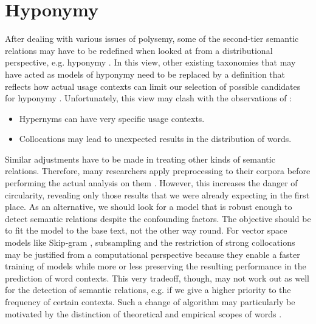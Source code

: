 
\chapter{Hyponymy}
After dealing with various issues of polysemy, some of the second-tier semantic relations may have to be redefined when looked at from a distributional perspective, e.g. hyponymy \parencite[443]{herbelotMeasuringSemanticContent2013}. In this view, other existing taxonomies that may have acted as models of hyponymy need to be replaced by a definition that reflects how actual usage contexts can limit our selection of possible candidates for hyponymy \parencite[443]{rollerInclusiveSelectiveSupervised2014}. Unfortunately, this view may clash with the observations of \textcite{herbelotMeasuringSemanticContent2013}:
\begin{itemize}
      \item Hypernyms can have very specific usage contexts.
      \item Collocations may lead to unexpected results in the distribution of words.
\end{itemize}
Similar adjustments have to be made in treating other kinds of semantic relations. Therefore, many researchers apply preprocessing to their corpora before performing the actual analysis on them \parencite[56f.]{gyllenstenRgramsUnsupervisedLearning2019}. However, this increases the danger of circularity, revealing only those results that we were already expecting in the first place. As an alternative, we should look for a model that is robust enough to detect semantic relations despite the confounding factors. The objective should be to fit the model to the base text, not the other way round. For vector space models like Skip-gram \parencite[5]{mikolovEfficientEstimationWord2013}, subsampling and the restriction of strong collocations may be justified from a computational perspective because they enable a faster training of models while more or less preserving the resulting performance in the prediction of word contexts. This very tradeoff, though, may not work out as well for the detection of semantic relations, e.g. if we give a higher priority to the frequency of certain contexts. Such a change of algorithm may particularly be motivated by the distinction of theoretical and empirical scopes of words \parencite[46]{coenenAnalogieUndMetapher2013}. 

